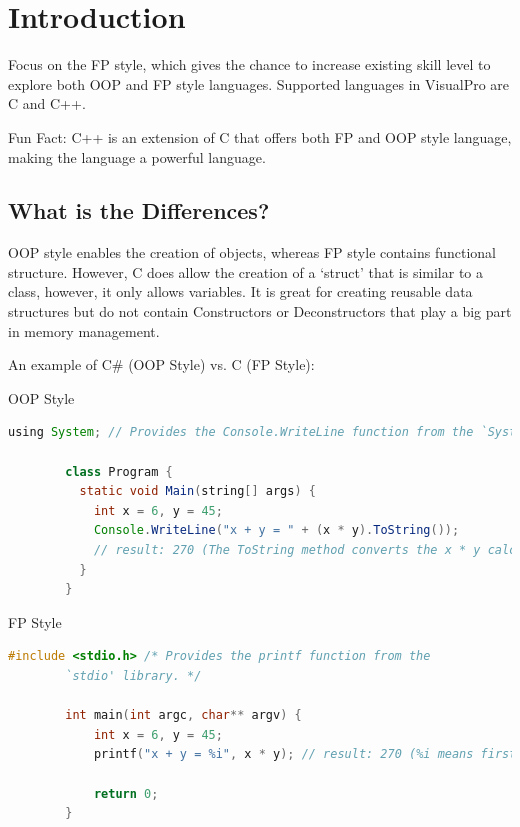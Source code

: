 \documentclass[10pt]{article}
\begin{document}
\newpage
\section{Introduction}
  Focus on the FP style, which gives the chance to increase existing skill level to explore both OOP and FP style languages. Supported languages in VisualPro are C and C++.

  \begin{tip}{Fun Fact:}
    C++ is an extension of C that offers both FP and OOP style language, making the language a powerful language.
  \end{tip}

  \subsection{What is the Differences?}
    OOP style enables the creation of objects, whereas FP style contains functional structure. However, C does allow the creation of a `struct' that is similar to a class, however, it only allows variables. It is great for creating reusable data structures but do not contain Constructors or Deconstructors that play a big part in memory management.
    
    An example of C\# (OOP Style) vs. C (FP Style):
    \begin{example}{OOP Style}
      \begin{lstlisting}[language=java]
        using System; // Provides the Console.WriteLine function from the `System' library.

        class Program { 
          static void Main(string[] args) {
            int x = 6, y = 45;
            Console.WriteLine("x + y = " + (x * y).ToString()); 
            // result: 270 (The ToString method converts the x * y calculation to a string and appends to the string).
          }
        }
      \end{lstlisting}
    \end{example}

    \begin{example}{FP Style}
      \begin{lstlisting}[language=c]
        #include <stdio.h> /* Provides the printf function from the 
        `stdio' library. */

        int main(int argc, char** argv) {
            int x = 6, y = 45;
            printf("x + y = %i", x * y); // result: 270 (%i means first parameter is an integer and includes it to the string).
            
            return 0;
        }
      \end{lstlisting}
    \end{example}
\end{document}
